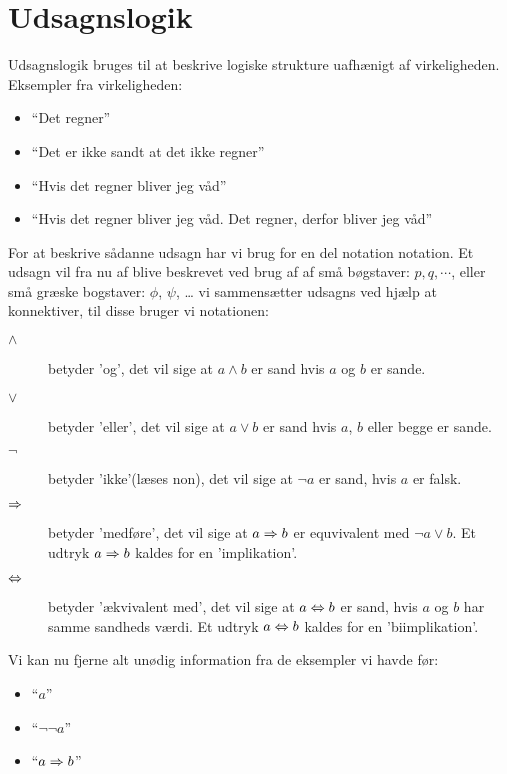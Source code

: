 \ifx\preampleIncluded\undefined
\def\startUdsagnslogik{}


\fi

\section{Udsagnslogik}
Udsagnslogik bruges til at beskrive logiske strukture uafhænigt af virkeligheden.
Eksempler fra virkeligheden:
\begin{itemize}
    \item ``Det regner''
    \item ``Det er ikke sandt at det ikke regner''
    \item ``Hvis det regner bliver jeg våd''
    \item ``Hvis det regner bliver jeg våd. Det regner, derfor bliver jeg våd''
\end{itemize}

For at beskrive sådanne udsagn har vi brug for en del notation notation. Et udsagn vil fra nu af blive beskrevet ved brug af af små bøgstaver: $p, q, \cdots$,
eller små græske bogstaver: $\phi$, $\psi$, \ldots
vi sammensætter udsagns ved hjælp at konnektiver, til disse bruger vi notationen:

\begin{description}
    \item[$\land$] betyder 'og', det vil sige at $a \land b$ er sand hvis $a$ og $b$ er sande.
    \item[$\lor$] betyder 'eller', det vil sige at $a \lor b$ er sand hvis $a$, $b$ eller begge er sande.
    \item[$\lnot$] betyder 'ikke'(læses non), det vil sige at $\lnot a$ er sand, hvis $a$ er falsk.
    \item[$\Rightarrow$] betyder 'medføre', det vil sige at $a \Rightarrow b$ er equvivalent med $\lnot a \lor b$. Et udtryk $a \Rightarrow b$ kaldes for en 'implikation'.
    \item[$\Leftrightarrow$] betyder 'ækvivalent med', det vil sige at $a \Leftrightarrow b$ er sand, hvis $a$ og $b$ har samme sandheds værdi. Et udtryk $a \Leftrightarrow b$ kaldes for en 'biimplikation'.
\end{description}



Vi kan nu fjerne alt unødig information fra de eksempler vi havde før:
\begin{itemize}
    \item ``$a$''
    \item ``$\lnot \lnot a$''
    \item ``$a \Rightarrow b$''
\end{itemize}

